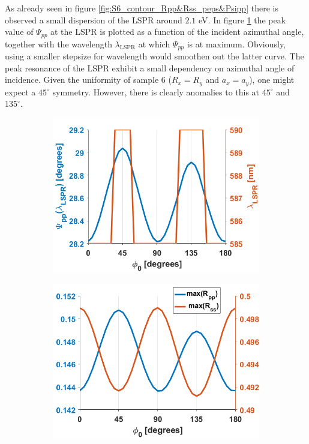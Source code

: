 As already seen in figure \ref{fig:S6_contour_Rpp&Rss_peps&Psipp} there is observed a small dispersion of the LSPR around $2.1$ eV. In figure \ref{fig:S6_LSPRvsphi_Psipp} the peak value of $\Psi_{pp}$ at the LSPR is plotted as a function of the incident azimuthal angle, together with the wavelength $\lambda_{\text{LSPR}}$ at which $\Psi_{pp}$ is at maximum. Obviously, using a smaller stepsize for wavelength would smoothen out the latter curve. The peak resonance of the LSPR exhibit a small dependency on azimuthal angle of incidence. Given the uniformity of sample 6 ($R_{x}=R_{y}$ and $a_x=a_y$), one might expect a $45^\circ$ symmetry. However, there is clearly anomalies to this at $45^\circ$ and $135^\circ$. 
\begin{figure}[h]
    \begin{subfigure}{0.5\textwidth}
        \centering
        \includegraphics[width=0.8\linewidth, trim=0cm  0cm 0cm 0cm, clip]{figures/ch4/S6/S6_Psi_pp@LSPR.png}
        \caption{}
        \label{fig:S6_LSPRvsphi_Psipp}
    \end{subfigure}
    \begin{subfigure}{0.5\textwidth}
        \centering
        \includegraphics[width=0.8\linewidth, trim=0cm  0cm 0cm 0cm, clip]{figures/ch4/S6/S6_Rpp_Rss@LSPR.png}

\end{subfigure}
\end{figure}
